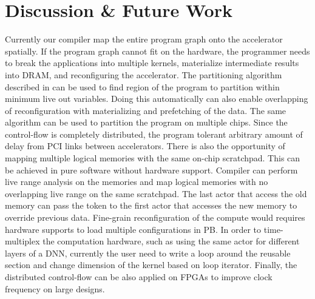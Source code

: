 \section{Discussion \& Future Work}
\label{sec:discussion}

Currently our compiler map the entire program graph onto the accelerator spatially.
If the program graph cannot fit on the hardware, the programmer needs to break the applications
into multiple kernels, materialize intermediate results into DRAM, and reconfiguring the accelerator.
The partitioning algorithm described in  can be used to find region of the program 
to partition within minimum live out variables. Doing this automatically can also enable overlapping
of reconfiguration with materializing and prefetching of the data.
The same algorithm can be used to partition the program on multiple chips. Since the control-flow
is completely distributed, the program tolerant arbitrary amount of delay from PCI links between
accelerators.
There is also the opportunity of mapping multiple logical memories with the same on-chip scratchpad. 
This can be achieved in pure software without hardware support. Compiler can perform live range analysis
on the memories and map logical memories with no overlapping live range on the same scratchpad. 
The last actor that access the old memory can pass the token to the first actor that accesses the new memory
to override previous data.
Fine-grain reconfiguration of the compute would requires hardware supports to load multiple configurations in PB.
In order to time-multiplex the computation hardware, such as using the same actor for different
layers of a DNN, currently the user need to write a loop around the reusable section and change dimension
of the kernel based on loop iterator. 
Finally, the distributed control-flow can be also applied on FPGAs to improve clock frequency on large designs.

